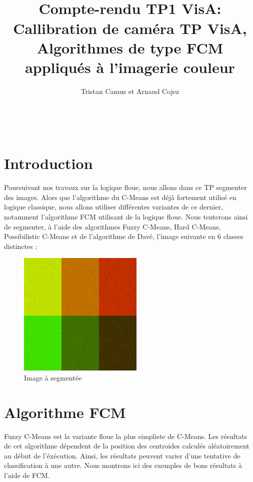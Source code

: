 \documentclass[a4paper,11pt]{article}
\title{
  \noindent\hrulefill \\
  \vspace{10mm} Compte-rendu TP1 VisA: Callibration de caméra
}
\title{TP VisA, Algorithmes de type FCM appliqués à l'imagerie couleur}
\author{Tristan Camus et Arnaud Cojez}
\date{}
\begin{document}
\maketitle

\noindent\hrulefill \\

\section{Introduction}

Poursuivant nos travaux sur la logique floue, nous allons dans ce TP segmenter des images.
Alors que l'algorithme du C-Means est déjà fortement utilisé en logique classique, nous allons utiliser différentes variantes de ce dernier, notamment l'algorithme FCM utilisant de la logique floue. Nous tenterons ainsi de segmenter, à l'aide des algorithmes Fuzzy C-Means, Hard C-Means, Possibilistic C-Means et de l'algorithme de Davé, l'image suivante en 6 classes distinctes :

\begin{figure}[H]
\begin{center}
\includegraphics[width=225px]{../img/6_classes_RGB.png}
\end{center}
\caption{Image à segmentée}
\end{figure}

\clearpage

\section{Algorithme FCM}
Fuzzy C-Means est la variante floue la plus simpliste de C-Means. Les résultats de cet algorithme dépendent de la position des centroides calculés aléatoirement au début de l'éxécution. Ainsi, les résultats peuvent varier d'une tentative de classification à une autre. Nous montrons ici des exemples de bons résultats à l'aide de FCM. \\
\end{document}
